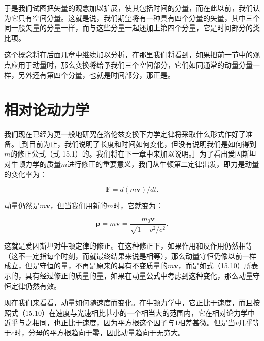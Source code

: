 \documentclass[12pt,oneside]{book}
\providecommand{\FLPvec}[1]{\boldsymbol{#1}}
\providecommand{\FLPF}[0]{\FLPvec{F}}
\providecommand{\FLPp}[0]{\FLPvec{p}}
\providecommand{\FLPv}[0]{\FLPvec{v}}
\begin{document}
于是我们试图把矢量的观念加以扩展，使其包括时间的分量，而在此以前，我们认为它只有空间分量。这就是说，我们期望将有一种具有四个分量的矢量，其中三个同一般矢量的分量一样，而与这些分量一起还加上第四个分量，它是时间部分的类比项。


这个概念将在后面几章中继续加以分析，在那里我们将看到，如果把前一节中的观点应用于动量时，那么变换将给予我们三个空间部分，它们如同通常的动量分量一样，另外还有第四个分量，也就是时间部分，那正是。


\section{相对论动力学}
我们现在已经为更一般地研究在洛伦兹变换下力学定律将采取什么形式作好了准备。［到目前为止，我们说明了长度和时间如何变化，但没有说明我们是如何得到$m$的修正公式（式 15.1）的。我们将在下一章中来加以说明。］为了看出爱因斯坦对牛顿力学的质量$m$进行修正的重要意义，我们从牛顿第二定律出发，即力是动量的变化率为：


\begin{equation*}
\FLPF=d(m\FLPv)/dt.
\end{equation*}

动量仍然是$m\FLPv$，但当我们用新的$m$时，它就变为：


\begin{equation}
\label{Eq:I:15:10}
\FLPp=m\FLPv=\frac{m_0\FLPv}{\sqrt{1-v^2/c^2}}.
\end{equation}

这就是爱因斯坦对牛顿定律的修正。在这种修正下，如果作用和反作用仍然相等（这不一定指每个时刻，而就最终结果来说是相等），那么动量守恒仍像以前一样成立，但是守恒的量，不再是原来的具有不变质量的$m\boldsymbol{v}$，而是如式（15.10）所表示的，具有经过修正的质量的量，如果在动量公式中考虑到这种变化，那么动量守恒定律仍然有效。


现在我们来看看，动量如何随速度而变化。在牛顿力学中，它正比于速度，而且按照式（15.10）在速度与光速相比甚小的一个相当大的范围内，它在相对论力学中近乎与之相同，也正比于速度，因为平方根这个因子与$1$相差甚微。但是当$v$几乎等于$c$时，分母的平方根趋向于零，因此动量趋向于无穷大。
\end{document}

